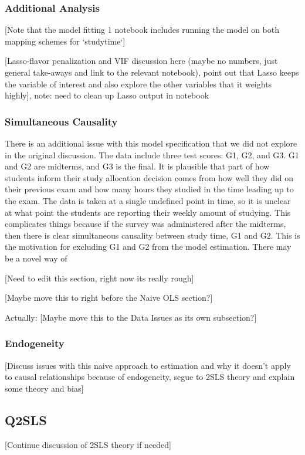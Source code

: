 \documentclass[12pt]{article}
\begin{document}
\subsubsection{Additional Analysis}
\textcolor{BrickRed}{[Note that the model fitting 1 notebook includes running the model on both mapping schemes for `studytime`]}

\textcolor{BrickRed}{[Lasso-flavor penalization and VIF discussion here (maybe no numbers, just general take-aways and link to the relevant notebook), point out that Lasso keeps the variable of interest and also explore the other variables that it weights highly]}, note: need to clean up Lasso output in notebook

\subsubsection{Simultaneous Causality}
There is an additional issue with this model specification that we did not explore in the original discussion. The data include three test scores: G1, G2, and G3. G1 and G2 are midterms, and G3 is the final. It is plausible that part of how students inform their study allocation decision comes from how well they did on their previous exam and how many hours they studied in the time leading up to the exam. The data is taken at a single undefined point in time, so it is unclear at what point the students are reporting their weekly amount of studying. This complicates things because if the survey was administered after the midterms, then there is clear simultaneous causality between study time, G1 and G2. This is the motivation for excluding G1 and G2 from the model estimation. There may be a novel way of 

\textcolor{BrickRed}{[Need to edit this section, right now its really rough]}

\textcolor{BrickRed}{[Maybe move this to right before the Naive OLS section?]}

Actually: \textcolor{BrickRed}{[Maybe move this to the Data Issues as its own subsection?]}

\subsubsection{Endogeneity}
\textcolor{BrickRed}{[Discuss issues with this naive approach to estimation and why it doesn't apply to causal relationships because of endogeneity, segue to 2SLS theory and explain some theory and bias]}

\subsection{Q2SLS}
\textcolor{BrickRed}{[Continue discussion of 2SLS theory if needed]}
\end{document}
